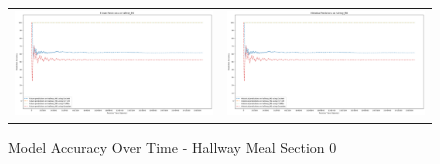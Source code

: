 \begin{figure}
  \begin{tabular}{cc}
    {\includegraphics[width = 3in]{images/results/Future_Predictions_on_hallway_M0.png}} &
    {\includegraphics[width = 3in]{images/results/Historical_Predictions_on_hallway_M0.png}} \\
  \end{tabular}
  \caption{Model Accuracy Over Time - Hallway Meal Section 0}
\end{figure}\\ \\



